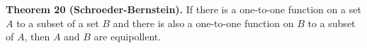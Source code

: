 \textbf{Theorem 20 (Schroeder-Bernstein).} If there is a one-to-one function on a set $A$ to a subset of a set $B$ and there is also a one-to-one function on $B$ to a subset of $A$, then $A$ and $B$ are equipollent.
